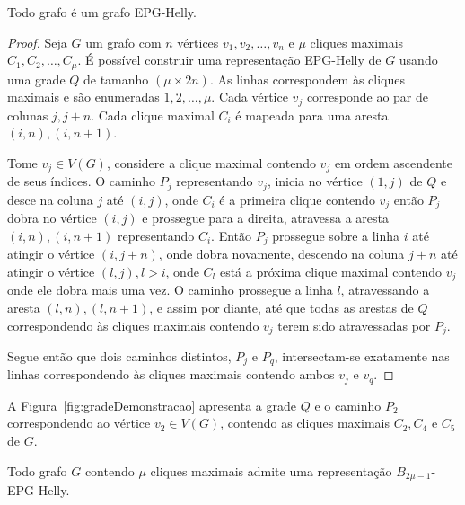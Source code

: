  \begin{lema}\label{lem:todoGrafoEpgHelly}
 Todo grafo é um grafo EPG-Helly.
 \end{lema}
  \begin{proof}
  Seja $G$ um grafo com $n$ vértices $v_1, v_2, \dots, v_n$ e $\mu$ cliques maximais $C_1, C_2, \dots , C_{\mu }$. É possível construir uma representação EPG-Helly de $G$ usando uma grade $Q$ de tamanho $(\mu \times 2n)$. As linhas correspondem às cliques maximais e são enumeradas $1, 2, \dots , \mu$. Cada vértice $v_j$ corresponde ao par de colunas $j, j+n$. Cada clique maximal  $C_i$ é mapeada para uma aresta $(i,n), (i,n+1)$. %
  
  
  Tome $v_j \in V(G)$, considere a clique maximal contendo $v_j$ em ordem ascendente de seus índices. O caminho $P_j$ representando $v_j$, inicia no vértice $(1,j)$ de $Q$ e desce na coluna $j$ até $(i,j)$, onde $C_i$ é a primeira clique contendo $v_j$ então $P_j$ dobra no vértice  $(i,j)$ e prossegue para a direita, atravessa a aresta $(i,n), (i,n+1)$ representando $C_i$. Então $P_j$ prossegue  sobre a linha $i$ até atingir o vértice  $(i, j+n)$, onde dobra novamente, descendo na coluna $j+n$ até atingir o vértice $(l,j), l>i$, onde $C_l$ está a próxima clique maximal contendo  $v_j$ onde ele dobra mais uma vez. O caminho prossegue a linha $l$, atravessando a aresta $(l,n),(l,n+1)$, e assim por diante, até que todas as arestas de $Q$ correspondendo às cliques maximais contendo $v_j$ terem sido atravessadas por $P_j$.   
  
Segue então que dois caminhos distintos, $P_j$ e $P_q$, intersectam-se exatamente nas linhas correspondendo às cliques maximais contendo ambos $v_j$ e $v_q$.  
  \end{proof}
 
 A Figura~\ref{fig:gradeDemonstracao} apresenta a grade $Q$ e o caminho $P_2$ correspondendo ao vértice $v_2 \in V(G)$, contendo as cliques maximais  $C_2, C_4$ e $C_5$ de $G$.
 
  
 
 
 
 \begin{corollary}
 Todo grafo $G$ contendo  $\mu$ cliques maximais admite uma representação $B_{2\mu -1}$-EPG-Helly. %
 \end{corollary}
 

